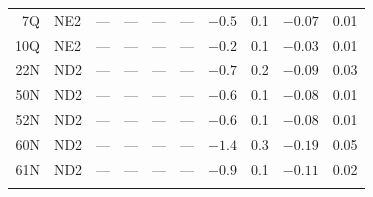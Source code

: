 \documentclass[smallextended]{svjour3}
\begin{document}
\begin{table}
\begin{tabular}{|rl|ll|ll|ll|ll|}
 7Q & NE2 & ---    &---&---      & --- & $-0.5$  & 0.1 & $-0.07$  & 0.01 \\
10Q & NE2 & ---    &---&---      & --- & $-0.2$  & 0.1 & $-0.03$  & 0.01 \\
22N & ND2 & ---    &---&---      & --- & $-0.7$  & 0.2 & $-0.09$  & 0.03 \\
50N & ND2 & ---    &---&---      & --- & $-0.6$  & 0.1 & $-0.08$  & 0.01 \\
52N & ND2 & ---    &---&---      & --- & $-0.6$  & 0.1 & $-0.08$  & 0.01 \\
60N & ND2 & ---    &---&---      & --- & $-1.4$  & 0.3 & $-0.19$  & 0.05 \\
61N & ND2 & ---    &---&---      & --- & $-0.9$  & 0.1 & $-0.11$  & 0.02 \\
\noalign{\smallskip}\hline
\end{tabular}
\label{tab:gtwo} 
\end{table}
\end{document}

